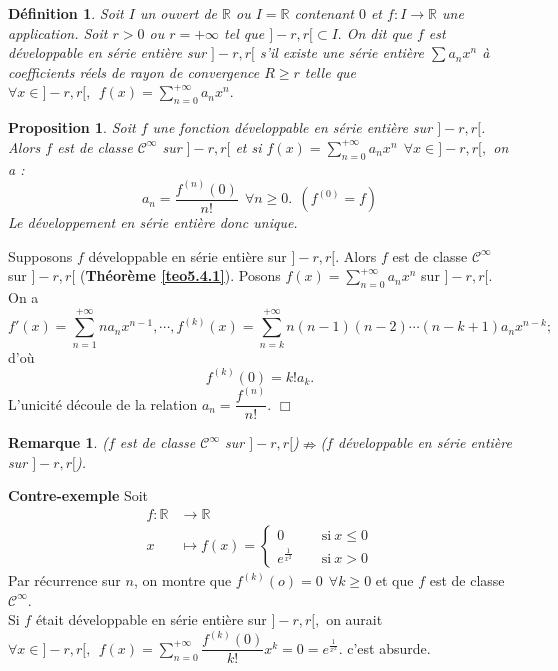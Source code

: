 \documentclass[11pt, a4paper]{book}
\newtheorem{defi}{D\'efinition}[section]
\newtheorem{pro}{Proposition}[section]
\newtheorem{rem}{Remarque}[section]
\newenvironment{pr}{\noindent {\bf Preuve} \noindent} {\hfill $\Box$\vskip 5mm}
\begin{document}
\begin{defi} Soit $I$ un ouvert de $\mathbb{R}$ ou $I=\mathbb{R}$ contenant $0$ et $f:I\longrightarrow\mathbb{R}$ une application. Soit $r>0$ ou $r=+\infty$ tel que $]-r,r[\subset I.$ On dit que $f$ est d\'eveloppable en s\'erie enti\`ere sur $]-r,r[$ s'il existe une s\'erie enti\`ere $\sum a_nx^n$ \`a coefficients r\'eels de rayon de convergence $R\geq r$ telle que ${\displaystyle\forall x\in ]-r,r[,~~f(x)=\sum_{n=0}^{+\infty}a_nx^n.}$
\end{defi}
\begin{pro} \label{pro5.4.2} Soit $f$ une fonction d\'eveloppable en s\'erie enti\`ere sur $]-r,r[$. Alors $f$ est de classe $\mathcal{C}^\infty$ sur $]-r,r[$ et si ${\displaystyle f(x)=\sum_{n=0}^{+\infty}a_nx^n~~\forall x\in ]-r,r[,}$ on a :$$ a_n=\dfrac{f^{(n)}(0)}{n!}~~\forall n\geq0.~~(f^{(0)}=f)$$
Le d\'eveloppement en s\'erie enti\`ere donc unique.
\end{pro}
\begin{pr}\quad
Supposons $f$ d\'eveloppable en s\'erie enti\`ere sur $]-r,r[$. Alors $f$ est de classe $\mathcal{C}^\infty$ sur $]-r,r[$ (\textbf{Th\'eor\`eme \ref{teo5.4.1}}). Posons ${\displaystyle f(x)=\sum_{n=0}^{+\infty}a_nx^n}$ sur $]-r,r[$. On a $$f'(x)=\sum_{n=1}^{+\infty}na_nx^{n-1},\cdots, f^{(k)}(x)=\sum_{n=k}^{+\infty}n(n-1)(n-2)\cdots(n-k+1)a_nx^{n-k};$$ d'o\`u $$f^{(k)}(0)=k!a_k.$$
L'unicit\'e d\'ecoule de la relation $a_n=\dfrac{f^{(n)}}{n!}.$
\end{pr}
\begin{rem} ($f$ est de classe $\mathcal{C}^\infty$ sur $]-r,r[$)$\nRightarrow$($f$ d\'eveloppable en s\'erie enti\`ere sur $]-r,r[$).
\end{rem}
\textbf{Contre-exemple}\quad
Soit \begin{align*}
f:\mathbb{R}&\longrightarrow\mathbb{R}\\x&\mapsto f(x)=
\begin{cases}0 &\quad~\text{si}~x\leq 0\\ e^{\frac{1}{x^2}}&\quad~\text{si}~x>0\end{cases}
\end{align*}
Par r\'ecurrence sur $n$, on montre que $f^{(k)}(o)=0~~\forall k\geq0$ et que $f$ est de classe $\mathcal{C}^\infty.$\\
Si $f$ \'etait d\'eveloppable en s\'erie enti\`ere sur $]-r,r[,$ on aurait ${\displaystyle\forall x\in ]-r,r[,~~f(x)=\sum_{n=0}^{+\infty}\dfrac{f^{(k)}(0)}{k!}x^k=0=e^{\frac{1}{x^2}}.}$ c'est absurde.
\end{document}
